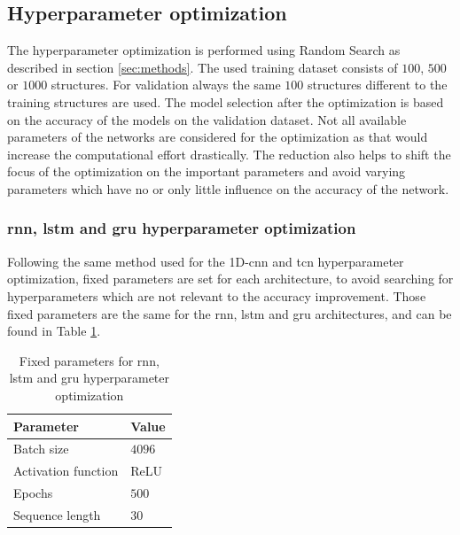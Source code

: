 \documentclass[conference]{IEEEtran}
\begin{document}

\subsection{Hyperparameter optimization}
\label{sec:hyperparameter_optimization_results}

The hyperparameter optimization is performed using Random Search as described in section \ref{sec:methods}. The used training dataset consists of $ 100 $, $ 500 $ or $ 1000 $ structures. For validation always the same $ 100 $ structures different to the training structures are used. The model selection after the optimization is based on the accuracy of the models on the validation dataset. Not all available parameters of the networks are considered for the optimization as that would increase the computational effort drastically. The reduction also helps to shift the focus of the optimization on the important parameters and avoid varying parameters which have no or only little influence on the accuracy of the network.

\subsubsection{\gls{rnn}, \gls{lstm} and \gls{gru} hyperparameter optimization}
\label{sec:rnn_hyperparameter_optimization}

Following the same method used for the 1D-\gls{cnn} and \gls{tcn} hyperparameter optimization, fixed parameters are set for each architecture, to avoid searching for hyperparameters which are not relevant to the accuracy improvement. Those fixed parameters are the same for the \gls{rnn}, \gls{lstm} and \gls{gru} architectures, and can be found in Table \ref{tab:fixed_parameters_rnn_optimization}.

\begin{table}[htp]
	\centering
	\caption{Fixed parameters for \gls{rnn}, \gls{lstm} and \gls{gru} hyperparameter optimization}
	\label{tab:fixed_parameters_rnn_optimization}
	\begin{tabular}{ll}
		\textbf{Parameter} & \textbf{Value} \\
		\hline
		Batch size & $ 4096 $ \\
		Activation function & ReLU \\
		Epochs & $ 500 $ \\
		Sequence length & $ 30 $ 
	\end{tabular}
\end{table}
\end{document}
